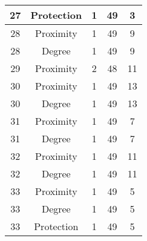 \documentclass[results.tex]{subfiles}
\begin{document}
\begin{center}
\begin{tabular}{| c || c | c | c | c |}
            \hline
            27                      & Protection                   & 1                      & 49                      & 3                    \\
            \hline
            28                      & Proximity                    & 1                      & 49                      & 9                    \\
            \hline
            28                      & Degree                       & 1                      & 49                      & 9                    \\
            \hline
            29                      & Proximity                    & 2                      & 48                      & 11                   \\
            \hline
            30                      & Proximity                    & 1                      & 49                      & 13                   \\
            \hline
            30                      & Degree                       & 1                      & 49                      & 13                   \\
            \hline
            31                      & Proximity                    & 1                      & 49                      & 7                    \\
            \hline
            31                      & Degree                       & 1                      & 49                      & 7                    \\
            \hline
            32                      & Proximity                    & 1                      & 49                      & 11                   \\
            \hline
            32                      & Degree                       & 1                      & 49                      & 11                   \\
            \hline
            33                      & Proximity                    & 1                      & 49                      & 5                    \\
            \hline
            33                      & Degree                       & 1                      & 49                      & 5                    \\
            \hline
            33                      & Protection                   & 1                      & 49                      & 5                    \\

\end{tabular}
\end{center}
\end{document}
